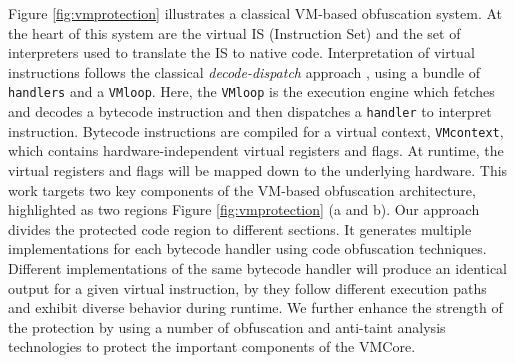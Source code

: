 Figure \ref{fig:vmprotection} illustrates a classical VM-based obfuscation system.
At the heart of this system are the virtual IS (Instruction Set) and the set of interpreters used
to translate the IS to native code.
Interpretation of virtual instructions follows the classical \textit{decode-dispatch} approach \cite{ghosh2012replacement},
using a bundle of \texttt{handlers} and a \texttt{VMloop}.
Here, the \texttt{VMloop} is the execution engine which fetches and decodes a bytecode instruction and then dispatches a \texttt{handler} to interpret instruction.
Bytecode instructions are compiled for a virtual context,  \texttt{VMcontext}, which contains hardware-independent virtual registers and flags.
At runtime, the virtual registers and flags will be mapped down to the underlying hardware.
This work targets two key components of the VM-based obfuscation architecture, highlighted as two regions Figure \ref{fig:vmprotection} (a and b).
Our approach divides the protected code region to different sections. It generates
multiple implementations for each bytecode handler using code obfuscation techniques. Different implementations
of the same bytecode handler will produce an identical output for a given virtual instruction, by they follow different execution paths and exhibit
diverse behavior during runtime. We further enhance the strength of the protection by using a number of obfuscation and anti-taint analysis technologies to protect the important components of the VMCore.



